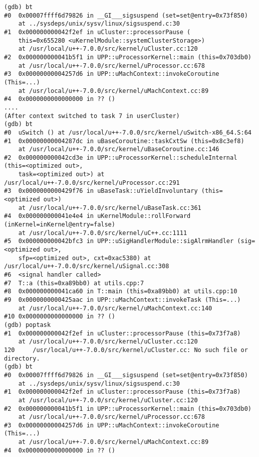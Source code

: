\begin{lstlisting}[caption={\text{poptask} command}, label={poptask}]
(gdb) bt
#0  0x00007ffff6d79826 in __GI___sigsuspend (set=set@entry=0x73f850)
    at ../sysdeps/unix/sysv/linux/sigsuspend.c:30
#1  0x000000000042f2ef in uCluster::processorPause (
    this=0x655280 <uKernelModule::systemClusterStorage>)
    at /usr/local/u++-7.0.0/src/kernel/uCluster.cc:120
#2  0x000000000041b5f1 in UPP::uProcessorKernel::main (this=0x703db0)
    at /usr/local/u++-7.0.0/src/kernel/uProcessor.cc:678
#3  0x00000000004257d6 in UPP::uMachContext::invokeCoroutine (This=...)
    at /usr/local/u++-7.0.0/src/kernel/uMachContext.cc:89
#4  0x0000000000000000 in ?? ()
....
(After context switched to task 7 in userCluster)
(gdb) bt
#0  uSwitch () at /usr/local/u++-7.0.0/src/kernel/uSwitch-x86_64.S:64
#1  0x00000000004287dc in uBaseCoroutine::taskCxtSw (this=0x8c3ef8)
    at /usr/local/u++-7.0.0/src/kernel/uBaseCoroutine.cc:146
#2  0x000000000042cd3e in UPP::uProcessorKernel::scheduleInternal (this=<optimized out>,
    task=<optimized out>) at /usr/local/u++-7.0.0/src/kernel/uProcessor.cc:291
#3  0x0000000000429f76 in uBaseTask::uYieldInvoluntary (this=<optimized out>)
    at /usr/local/u++-7.0.0/src/kernel/uBaseTask.cc:361
#4  0x000000000041e4e4 in uKernelModule::rollForward (inKernel=inKernel@entry=false)
    at /usr/local/u++-7.0.0/src/kernel/uC++.cc:1111
#5  0x000000000042bfc3 in UPP::uSigHandlerModule::sigAlrmHandler (sig=<optimized out>,
    sfp=<optimized out>, cxt=0xac5380) at /usr/local/u++-7.0.0/src/kernel/uSignal.cc:308
#6  <signal handler called>
#7  T::a (this=0xa89bb0) at utils.cpp:7
#8  0x000000000041ca60 in T::main (this=0xa89bb0) at utils.cpp:10
#9  0x0000000000425aac in UPP::uMachContext::invokeTask (This=...)
    at /usr/local/u++-7.0.0/src/kernel/uMachContext.cc:140
#10 0x0000000000000000 in ?? ()
(gdb) poptask
#1  0x000000000042f2ef in uCluster::processorPause (this=0x73f7a8)
    at /usr/local/u++-7.0.0/src/kernel/uCluster.cc:120
120     /usr/local/u++-7.0.0/src/kernel/uCluster.cc: No such file or directory.
(gdb) bt
#0  0x00007ffff6d79826 in __GI___sigsuspend (set=set@entry=0x73f850)
    at ../sysdeps/unix/sysv/linux/sigsuspend.c:30
#1  0x000000000042f2ef in uCluster::processorPause (this=0x73f7a8)
    at /usr/local/u++-7.0.0/src/kernel/uCluster.cc:120
#2  0x000000000041b5f1 in UPP::uProcessorKernel::main (this=0x703db0)
    at /usr/local/u++-7.0.0/src/kernel/uProcessor.cc:678
#3  0x00000000004257d6 in UPP::uMachContext::invokeCoroutine (This=...)
    at /usr/local/u++-7.0.0/src/kernel/uMachContext.cc:89
#4  0x0000000000000000 in ?? ()
\end{lstlisting}

